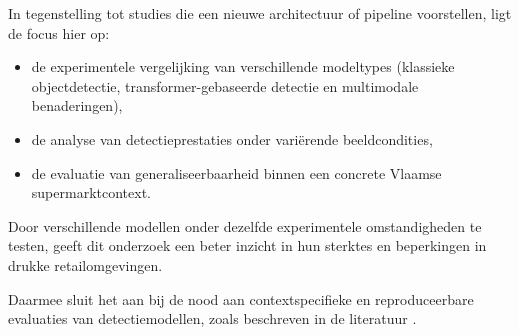 In tegenstelling tot studies die een nieuwe architectuur of pipeline voorstellen, ligt de focus hier op:

\begin{itemize}
\item de experimentele vergelijking van verschillende modeltypes (klassieke objectdetectie, transformer-gebaseerde detectie en multimodale benaderingen),
\item de analyse van detectieprestaties onder variërende beeldcondities,
\item de evaluatie van generaliseerbaarheid binnen een concrete Vlaamse supermarktcontext.
\end{itemize}

Door verschillende modellen onder dezelfde experimentele omstandigheden te testen, geeft dit onderzoek een beter inzicht in hun sterktes en beperkingen in drukke retailomgevingen.

Daarmee sluit het aan bij de nood aan contextspecifieke en reproduceerbare evaluaties van detectiemodellen, zoals beschreven in de literatuur \autocite{MELEK2024108452}.